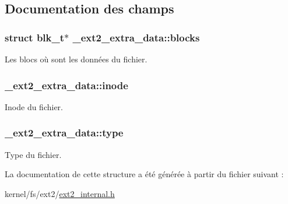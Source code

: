 \subsection{\-Documentation des champs}
\hypertarget{struct__ext2__extra__data_ab7503f7c0104cc8e081af354595fb1a0}{
\subsubsection[{blocks}]{\setlength{\rightskip}{0pt plus 5cm}struct {\bf blk\-\_\-t}$\ast$ {\bf \-\_\-ext2\-\_\-extra\-\_\-data\-::blocks}}}\label{struct__ext2__extra__data_ab7503f7c0104cc8e081af354595fb1a0}
\-Les blocs où sont les données du fichier. \hypertarget{struct__ext2__extra__data_a67635cdfceeb4475b1410ec3bc8ae552}{
\subsubsection[{inode}]{ {\bf \-\_\-ext2\-\_\-extra\-\_\-data\-::inode}}}\label{struct__ext2__extra__data_a67635cdfceeb4475b1410ec3bc8ae552}
\-Inode du fichier. \hypertarget{struct__ext2__extra__data_a607854c0e8d75ee5be59b7e67eb2a00c}{
\subsubsection[{type}]{ {\bf \-\_\-ext2\-\_\-extra\-\_\-data\-::type}}}\label{struct__ext2__extra__data_a607854c0e8d75ee5be59b7e67eb2a00c}
\-Type du fichier. 

\-La documentation de cette structure a été générée à partir du fichier suivant \-:\begin{DoxyCompactItemize}
\item 
kernel/fs/ext2/\hyperlink{ext2__internal_8h}{ext2\-\_\-internal.\-h}\end{DoxyCompactItemize}
